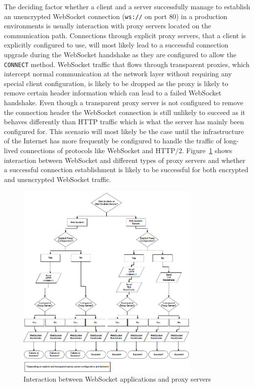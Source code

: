 The deciding factor whether a client and a server successfully manage to establish an unencrypted WebSocket connection (\texttt{ws://} on port 80) in a production environments is usually interaction with proxy servers located on the communication path. Connections through explicit proxy servers, that a client is explicitly configured to use, will most likely lead to a successful connection upgrade during the WebSocket handshake as they are configured to allow the \texttt{CONNECT} method. WebSocket traffic that flows through transparent proxies, which intercept normal communication at the network layer without requiring any special client configuration, is likely to be dropped as the proxy is likely to remove certain header information which can lead to a failed WebSocket handshake. Even though a transparent proxy server is not configured to remove the connection header the WebSocket connection is still unlikely to succeed as it behaves differently than HTTP traffic which is what the server has mainly been configured for. This scenario will most likely be the case until the infrastructure of the Internet has more frequently be configured to handle the traffic of long-lived connections of protocols like WebSocket and HTTP/2. Figure~\ref{fig:webSocketProxyServer} shows interaction between WebSocket and different types of proxy servers and whether a successful connection establishment is likely to be successful for both encrypted and unencrypted WebSocket traffic.
\\
\begin{figure}[h!]
	\centering
	\includegraphics[width=0.8\textwidth]{images/websocketProxyServer}
	\caption{Interaction between WebSocket applications and proxy servers \cite{wang2013definitive}}
	\label{fig:webSocketProxyServer}
\end{figure}

